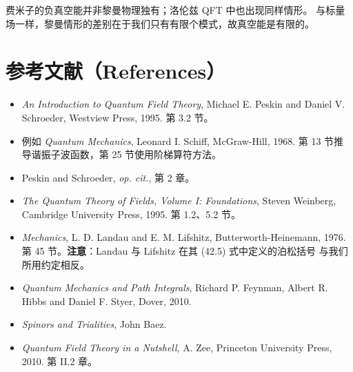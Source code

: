 费米子的负真空能并非黎曼物理独有；洛伦兹 QFT 中也出现同样情形。
与标量场一样，黎曼情形的差别在于我们只有有限个模式，故真空能是有限的。

\section*{参考文献（References）}
\begin{itemize}[leftmargin=2em]
  \item[{[1]}] \emph{An Introduction to Quantum Field Theory}, Michael E. Peskin and Daniel V. Schroeder,
        Westview Press, 1995. 第 3.2 节。
  \item[{[2]}] 例如 \emph{Quantum Mechanics}, Leonard I. Schiff, McGraw-Hill, 1968.
        第 13 节推导谐振子波函数，第 25 节使用阶梯算符方法。
  \item[{[3]}] Peskin and Schroeder, \emph{op. cit.}, 第 2 章。
  \item[{[4]}] \emph{The Quantum Theory of Fields, Volume I: Foundations}, Steven Weinberg,
        Cambridge University Press, 1995. 第 1.2、5.2 节。
  \item[{[5]}] \emph{Mechanics}, L. D. Landau and E. M. Lifshitz, Butterworth-Heinemann, 1976.
        第 45 节。\textbf{注意}：Landau 与 Lifshitz 在其 (42.5) 式中定义的泊松括号
        与我们所用约定相反。
  \item[{[6]}] \emph{Quantum Mechanics and Path Integrals}, Richard P. Feynman, Albert R. Hibbs
        and Daniel F. Styer, Dover, 2010.
  \item[{[7]}] \emph{Spinors and Trialities}, John Baez.
  \item[{[8]}] \emph{Quantum Field Theory in a Nutshell}, A. Zee, Princeton University Press, 2010.
        第 II.2 章。
\end{itemize}
